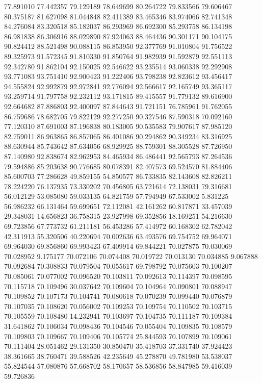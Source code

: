 77.891010
77.442357
79.129189
78.649699
80.264722
79.833566
79.606467
80.375187
81.627098
81.044848
82.411389
83.465346
83.974066
82.741348
84.276084
83.320518
85.182037
86.293969
86.692300
85.293758
86.134198
86.981838
86.306916
88.029890
87.924063
88.464436
90.301171
90.104175
90.824412
88.521498
90.088115
86.853950
92.377769
91.010804
91.756522
89.325973
91.572345
91.810330
91.850764
91.982939
91.592879
92.551113
92.342780
91.862104
92.150025
92.546622
93.235514
93.060338
92.292908
93.771083
93.751410
92.900423
91.222406
93.798238
92.823612
93.456417
94.555824
92.992879
92.972841
92.776094
92.566617
92.165749
93.365117
93.259714
91.797758
92.232112
93.171815
89.415557
91.779132
89.616900
92.664682
87.886803
92.400097
87.844643
91.721151
76.785961
91.762055
86.759686
78.682705
79.822129
92.277250
90.327546
87.590318
70.092160
77.120310
87.691003
87.196838
80.183005
90.535583
79.907617
87.985120
82.759011
86.963865
86.857065
86.401086
90.294862
90.349234
83.316925
88.630944
85.743642
87.634056
68.929925
88.759301
88.305528
87.726950
87.140980
92.838674
82.962953
84.465934
86.486441
92.565793
87.264536
79.594886
85.203638
90.776685
80.078391
82.407573
69.524570
81.884406
85.600703
77.286628
49.859155
54.850577
86.733835
82.143608
82.826211
78.224220
76.137935
73.330202
70.456805
63.721614
72.138031
79.316681
56.012129
53.085080
59.033135
64.821759
57.794949
67.533002
5.831225
56.986232
66.131464
59.699651
72.112081
42.161262
60.817871
33.457039
29.348031
14.656823
36.758315
23.927998
69.352856
18.169251
54.216630
69.723856
67.773732
61.211181
56.453286
57.414972
60.168302
62.782042
42.311913
55.320506
40.220694
70.002636
63.493576
69.754752
69.964071
69.964030
69.856860
69.993423
67.409914
69.844221
70.027875
70.030069
70.028952
9.175177
70.072106
70.074408
70.019722
70.013130
70.034885
9.067888
70.092684
70.308833
70.079504
70.055617
69.798792
70.075603
70.100207
70.085061
70.077002
70.096520
70.103811
70.092613
70.114397
70.098595
70.115718
70.109496
30.037642
70.109604
70.104964
70.090801
70.088947
70.109852
70.107173
70.104741
70.080618
70.070239
70.099440
70.076879
70.107035
70.108620
70.056002
70.109253
70.109754
70.110502
70.103715
70.105559
70.108480
14.232941
70.103697
70.104735
70.111187
70.109384
31.641862
70.106034
70.098436
70.104546
70.055404
70.109835
70.108579
70.109803
70.109667
70.109406
70.105774
25.844593
70.107899
70.109061
70.111404
28.051462
29.131350
30.850470
35.418703
37.331740
37.924423
38.361665
38.760471
39.588526
42.235649
45.278870
49.781980
53.538037
55.824544
57.080876
57.668702
58.170657
58.536856
58.847985
59.416039
59.726836

